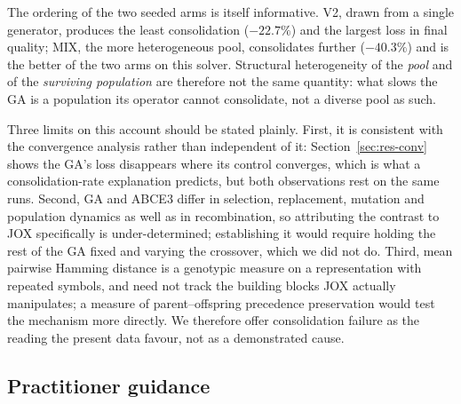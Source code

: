 \documentclass[review]{elsarticle}
\begin{document}
The ordering of the two seeded arms is itself informative. V2, drawn from a
single generator, produces the least consolidation ($-22.7\%$) and the
largest loss in final quality; MIX, the more heterogeneous pool,
consolidates further ($-40.3\%$) and is the better of the two arms on this
solver. Structural heterogeneity of the \emph{pool} and of the
\emph{surviving population} are therefore not the same quantity: what slows
the GA is a population its operator cannot consolidate, not a diverse pool
as such.

Three limits on this account should be stated plainly. First, it is
consistent with the convergence analysis rather than independent of it:
Section~\ref{sec:res-conv} shows the GA's loss disappears where its control
converges, which is what a consolidation-rate explanation predicts, but
both observations rest on the same runs. Second, GA and ABCE3 differ in
selection, replacement, mutation and population dynamics as well as in
recombination, so attributing the contrast to JOX specifically is
under-determined; establishing it would require holding the rest of the GA
fixed and varying the crossover, which we did not do. Third, mean pairwise
Hamming distance is a genotypic measure on a representation with repeated
symbols, and need not track the building blocks JOX actually manipulates;
a measure of parent--offspring precedence preservation would test the
mechanism more directly. We therefore offer consolidation failure as the
reading the present data favour, not as a demonstrated cause.

\subsection{Practitioner guidance}
\end{document}
